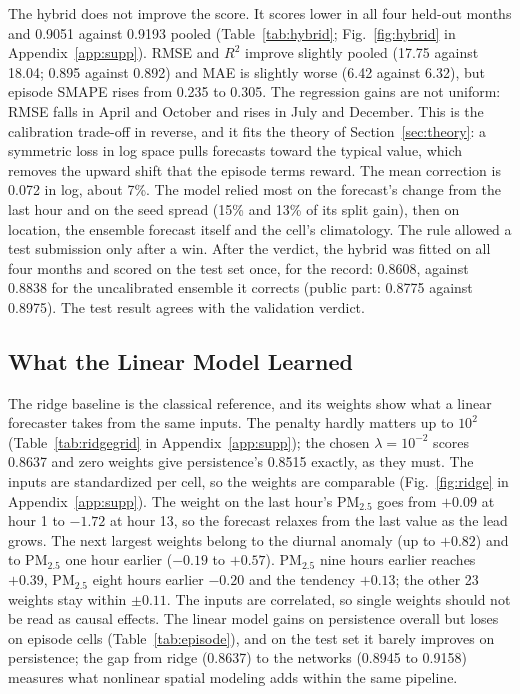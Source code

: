 \documentclass[journal]{IEEEtran}
\newcommand{\PM}{PM$_{2.5}$}
\begin{document}
The hybrid does not improve the score. It scores lower in all four held-out months and 0.9051 against 0.9193 pooled (Table~\ref{tab:hybrid}; Fig.~\ref{fig:hybrid} in Appendix~\ref{app:supp}). RMSE and $R^2$ improve slightly pooled (17.75 against 18.04; 0.895 against 0.892) and MAE is slightly worse (6.42 against 6.32), but episode SMAPE rises from 0.235 to 0.305. The regression gains are not uniform: RMSE falls in April and October and rises in July and December. This is the calibration trade-off in reverse, and it fits the theory of Section~\ref{sec:theory}: a symmetric loss in log space pulls forecasts toward the typical value, which removes the upward shift that the episode terms reward. The mean correction is 0.072 in log, about 7\%. The model relied most on the forecast's change from the last hour and on the seed spread (15\% and 13\% of its split gain), then on location, the ensemble forecast itself and the cell's climatology. The rule allowed a test submission only after a win. After the verdict, the hybrid was fitted on all four months and scored on the test set once, for the record: 0.8608, against 0.8838 for the uncalibrated ensemble it corrects (public part: 0.8775 against 0.8975). The test result agrees with the validation verdict.

\subsection{What the Linear Model Learned}
\label{sec:ridge}
The ridge baseline is the classical reference, and its weights show what a linear forecaster takes from the same inputs. The penalty hardly matters up to $10^2$ (Table~\ref{tab:ridgegrid} in Appendix~\ref{app:supp}); the chosen $\lambda=10^{-2}$ scores 0.8637 and zero weights give persistence's 0.8515 exactly, as they must. The inputs are standardized per cell, so the weights are comparable (Fig.~\ref{fig:ridge} in Appendix~\ref{app:supp}). The weight on the last hour's \PM{} goes from $+0.09$ at hour 1 to $-1.72$ at hour 13, so the forecast relaxes from the last value as the lead grows. The next largest weights belong to the diurnal anomaly (up to $+0.82$) and to \PM{} one hour earlier ($-0.19$ to $+0.57$). \PM{} nine hours earlier reaches $+0.39$, \PM{} eight hours earlier $-0.20$ and the tendency $+0.13$; the other 23 weights stay within $\pm0.11$. The inputs are correlated, so single weights should not be read as causal effects. The linear model gains on persistence overall but loses on episode cells (Table~\ref{tab:episode}), and on the test set it barely improves on persistence; the gap from ridge (0.8637) to the networks (0.8945 to 0.9158) measures what nonlinear spatial modeling adds within the same pipeline.
\end{document}
